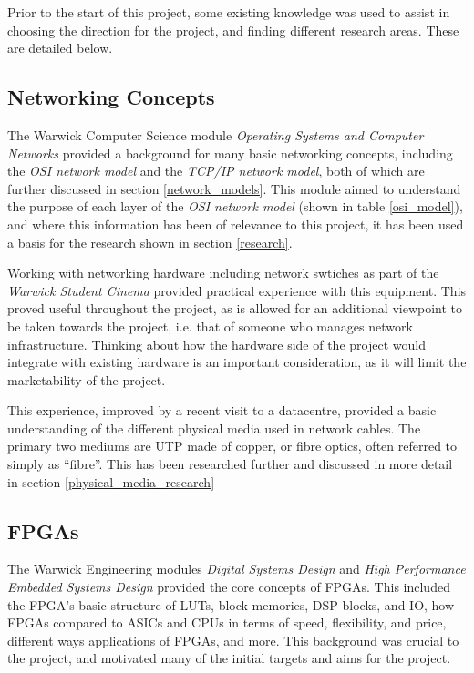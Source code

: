 Prior to the start of this project, some existing knowledge was used to assist in choosing the direction for the project, and finding different research areas. These are detailed below.

\subsection{Networking Concepts}
\label{networking_concepts}
The Warwick Computer Science module \textit{Operating Systems and Computer Networks} \cite{cs241} provided a background for many basic networking concepts, including the \textit{OSI network model} and the \textit{TCP/IP network model}, both of which are further discussed in section \ref{network_models}. This module aimed to understand the purpose of each layer of the \textit{OSI network model} (shown in table \ref{osi_model}), and where this information has been of relevance to this project, it has been used a basis for the research shown in section \ref{research}.

Working with networking hardware including network swtiches as part of the \textit{Warwick Student Cinema} \cite{wsc} provided practical experience with this equipment. This proved useful throughout the project, as is allowed for an additional viewpoint to be taken towards the project, i.e. that of someone who manages network infrastructure. Thinking about how the hardware side of the project would integrate with existing hardware is an important consideration, as it will limit the marketability of the project.

This experience, improved by a recent visit to a datacentre, provided a basic understanding of the different physical media used in network cables. The primary two mediums are UTP made of copper, or fibre optics, often referred to simply as ``fibre''. This has been researched further and discussed in more detail in section \ref{physical_media_research}






\subsection{FPGAs}
\label{fpgas}

The Warwick Engineering modules \textit{Digital Systems Design} \cite{es3b2} and \textit{High Performance Embedded Systems Design} \cite{es3f1} provided the core concepts of FPGAs. This included the FPGA's basic structure of LUTs, block memories, DSP blocks, and IO, how FPGAs compared to ASICs and CPUs in terms of speed, flexibility, and price, different ways applications of FPGAs, and more. This background was crucial to the project, and motivated many of the initial targets and aims for the project.


